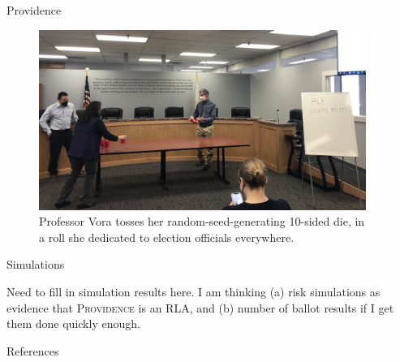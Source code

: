 \documentclass[final]{beamer}
\newcommand{\Prov}{\textsc{Providence}\xspace}
\newlength{\sepwidth}
\newlength{\colwidth}
\newcommand{\separatorcolumn}{\begin{column}{\sepwidth}\end{column}}
\begin{document}
\begin{frame}[t]
\begin{columns}[t]
\begin{column}{\colwidth}
\begin{block}{Providence}
\begin{figure}
\includegraphics[width=1.0\textwidth]{dice.jpg}
\caption{Professor Vora tosses her random-seed-generating 10-sided die, in a roll she dedicated to election officials everywhere.}
\end{figure}

\end{block}

\begin{block}{Simulations}

Need to fill in simulation results here. I am thinking (a) risk simulations as evidence that \Prov is an RLA, 
and (b) number of ballot results if I get them done quickly enough.

\end{block}



  \begin{block}{References}

    \footnotesize{}

  \end{block}


\end{column}

\separatorcolumn

\end{columns}

\end{frame}
\end{document}
